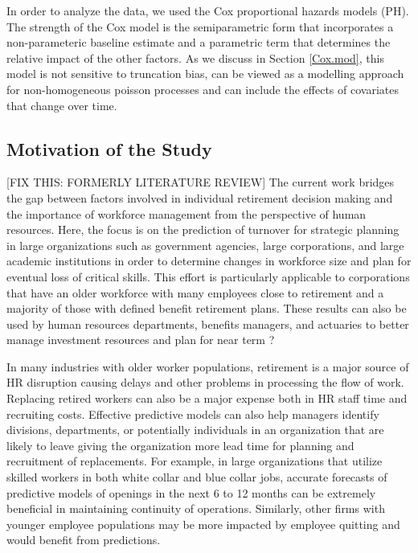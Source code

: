 \documentclass[12pt,letterpaper]{article}
\begin{document}
In order to analyze the data, we used the Cox proportional hazards models (PH).  The strength of the Cox model is the semiparametric form that incorporates a non-parameteric baseline estimate and a parametric term that determines the relative impact of the other factors. As we discuss in Section \ref{Cox.mod}, this model is not sensitive to truncation bias, can be viewed as a modelling approach for non-homogeneous poisson processes and can include the effects of covariates that change over time.


\subsection{Motivation of the Study}

[FIX THIS: FORMERLY LITERATURE REVIEW]
The current work bridges the gap between factors involved in individual retirement decision making and the importance of workforce management from the perspective of human resources.  Here, the focus is on the prediction of turnover for strategic planning in large organizations such as government agencies, large corporations, and large academic institutions in order to determine changes in workforce size and plan for eventual loss of critical skills. This effort is particularly applicable to corporations that have an older workforce with many employees close to retirement and a majority of those with defined benefit retirement plans.  These results can also be used by human resources departments, benefits managers, and actuaries to better manage investment resources and plan for near term ?

In many industries with older worker populations, retirement is a major source of HR disruption causing delays and other problems in processing the flow of work.  Replacing retired workers can also be a major expense both in HR staff time and recruiting costs.  Effective predictive models can also help managers identify divisions, departments, or potentially individuals in an organization that are likely to leave giving the organization more lead time for planning and recruitment of replacements.  For example, in large organizations that utilize skilled workers in both white collar and blue collar jobs, accurate forecasts of predictive models of openings in the next 6 to 12 months can be extremely beneficial in maintaining continuity of operations.  Similarly, other firms with younger employee populations may be more impacted by employee quitting and would benefit from predictions.
\end{document}

